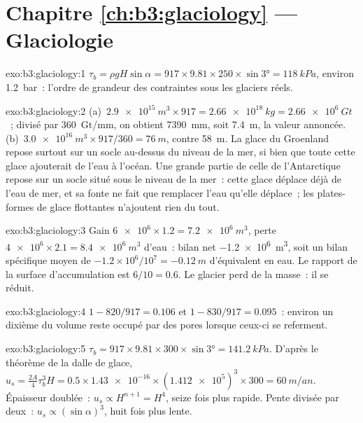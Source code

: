 \section*{Chapitre \ref{ch:b3:glaciology} --- Glaciologie}

\begin{solution}{exo:b3:glaciology:1}
$\tau_b = \rho gH\sin\alpha = 917\times9.81\times250\times\sin\ang{3} =
\qty{118}{kPa}$, environ \qty{1.2}{bar}~: l'ordre de grandeur des contraintes
sous les glaciers réels.
\end{solution}

\begin{solution}{exo:b3:glaciology:2}
(a)~$\qty{2.9e15}{m^3}\times917 = \qty{2.66e18}{kg} = \qty{2.66e6}{Gt}$~;
divisé par \qty{360}{Gt/mm}, on obtient \qty{7390}{mm}, soit \qty{7.4}{m}, la valeur annoncée.
(b)~$\qty{3.0e16}{m^3}\times917/360 = \qty{76}{m}$, contre \qty{58}{m}.
La glace du Groenland repose surtout sur un socle au-dessus du niveau de la mer, si bien que toute cette glace
ajouterait de l'eau à l'océan. Une grande partie de celle de l'Antarctique repose sur un socle situé sous
le niveau de la mer~: cette glace déplace déjà de l'eau de mer, et sa fonte ne fait que remplacer
l'eau qu'elle déplace~; les plates-formes de glace flottantes n'ajoutent rien du tout.
\end{solution}

\begin{solution}{exo:b3:glaciology:3}
Gain $\num{6e6}\times1.2 = \qty{7.2e6}{m^3}$, perte $\num{4e6}\times2.1 =
\qty{8.4e6}{m^3}$ d'eau~: bilan net \qty{-1.2e6}{m^3}, soit un bilan spécifique moyen
de $-1.2\times10^6/10^7 = \qty{-0.12}{m}$ d'équivalent en eau. Le
rapport de la surface d'accumulation est $6/10 = 0.6$. Le glacier perd de la masse~:
il se réduit.
\end{solution}

\begin{solution}{exo:b3:glaciology:4}
$1 - 820/917 = \num{0.106}$ et $1 - 830/917 = \num{0.095}$~: environ un dixième
du volume reste occupé par des pores lorsque ceux-ci se referment.
\end{solution}

\begin{solution}{exo:b3:glaciology:5}
$\tau_b = 917\times9.81\times300\times\sin\ang{3} = \qty{141.2}{kPa}$. D'après
le théorème de la dalle de glace, $u_s = \tfrac{2A}{4}\tau_b^3H = 0.5\times\num{1.43e-16}
\times(\num{1.412e5})^3\times300 = \qty{60}{m/an}$. Épaisseur doublée~: $u_s
\propto H^{n+1} = H^4$, seize fois plus rapide. Pente divisée par deux~: $u_s \propto
(\sin\alpha)^3$, huit fois plus lente.
\end{solution}

